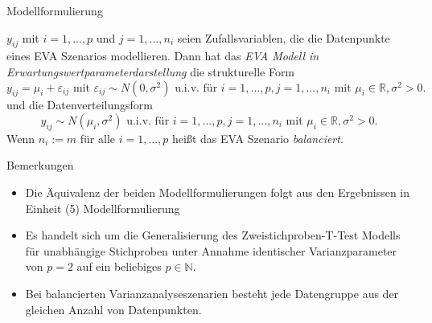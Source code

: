 \documentclass[
  8pt,
  ignorenonframetext,
]{beamer}
\providecommand{\tightlist}{%
  \setlength{\itemsep}{0pt}\setlength{\parskip}{0pt}}
\begin{document}
\begin{frame}{Modellformulierung}
\protect\hypertarget{modellformulierung}{}
\footnotesize
\begin{definition}
\justifying
$y_{ij}$ mit $i= 1,...,p$ und $j = 1,...,n_i$ seien Zufallsvariablen, die
die Datenpunkte eines EVA Szenarios modellieren. Dann hat das
\textit{EVA Modell in Erwartungswertparameterdarstellung} die strukturelle Form
\begin{equation}
y_{ij} = \mu_i + \varepsilon_{ij}
\mbox{ mit } \varepsilon_{ij} \sim N(0,\sigma^2)
\mbox{ u.i.v. für } i = 1,...,p, j = 1,...,n_i \mbox{ mit } \mu_i \in \mathbb{R}, \sigma^2 > 0.
\end{equation}
und die Datenverteilungsform
\begin{equation}\label{eq:aov_1_klassisch}
y_{ij} \sim N(\mu_i,\sigma^2) \mbox{ u.i.v. für } i = 1,...,p, j = 1,...,n_i \mbox{ mit } \mu_i \in \mathbb{R}, \sigma^2 > 0.
\end{equation}
Wenn $n_i := m$ für alle $i = 1,...,p$ heißt das EVA Szenario \textit{balanciert}.
\end{definition}

Bemerkungen

\begin{itemize}
\tightlist
\item
  \justifying Die Äquivalenz der beiden Modellformulierungen folgt aus
  den Ergebnissen in Einheit (5) Modellformulierung
\item
  Es handelt sich um die Generalisierung des Zweistichproben-T-Test
  Modells für unabhängige Stichproben unter Annahme identischer
  Varianzparameter von \(p = 2\) auf ein beliebiges
  \(p \in \mathbb{N}\).
\item
  Bei balancierten Varianzanalyseszenarien besteht jede Datengruppe aus
  der gleichen Anzahl von Datenpunkten.
\end{itemize}
\end{frame}
\end{document}
